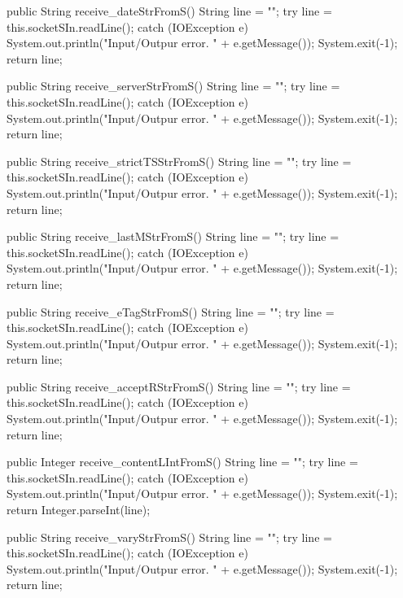 \begin{code}
{    public String receive_dateStrFromS() {
        String line = "";
        try {
            line = this.socketSIn.readLine();
        } catch (IOException e) {
            System.out.println("Input/Outpur error. " + e.getMessage());
            System.exit(-1);
        }
        return line;
    }

    public String receive_serverStrFromS() {
        String line = "";
        try {
            line = this.socketSIn.readLine();
        } catch (IOException e) {
            System.out.println("Input/Outpur error. " + e.getMessage());
            System.exit(-1);
        }
        return line;
    }

    public String receive_strictTSStrFromS() {
        String line = "";
        try {
            line = this.socketSIn.readLine();
        } catch (IOException e) {
            System.out.println("Input/Outpur error. " + e.getMessage());
            System.exit(-1);
        }
        return line;
    }

    public String receive_lastMStrFromS() {
        String line = "";
        try {
            line = this.socketSIn.readLine();
        } catch (IOException e) {
            System.out.println("Input/Outpur error. " + e.getMessage());
            System.exit(-1);
        }
        return line;
    }

    public String receive_eTagStrFromS() {
        String line = "";
        try {
            line = this.socketSIn.readLine();
        } catch (IOException e) {
            System.out.println("Input/Outpur error. " + e.getMessage());
            System.exit(-1);
        }
        return line;
    }

    public String receive_acceptRStrFromS() {
        String line = "";
        try {
            line = this.socketSIn.readLine();
        } catch (IOException e) {
            System.out.println("Input/Outpur error. " + e.getMessage());
            System.exit(-1);
        }
        return line;
    }

    public Integer receive_contentLIntFromS() {
        String line = "";
        try {
            line = this.socketSIn.readLine();
        } catch (IOException e) {
            System.out.println("Input/Outpur error. " + e.getMessage());
            System.exit(-1);
        }
        return Integer.parseInt(line);
    }

    public String receive_varyStrFromS() {
        String line = "";
        try {
            line = this.socketSIn.readLine();
        } catch (IOException e) {
            System.out.println("Input/Outpur error. " + e.getMessage());
            System.exit(-1);
        }
        return line;
    }

}
\end{code}
